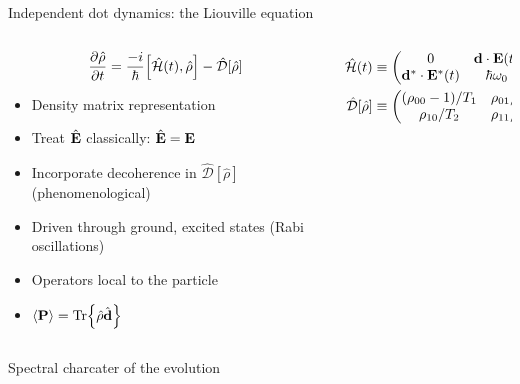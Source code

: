 \documentclass[aspectratio=169, usenames, dvipsnames]{beamer}
\begin{document}
\begin{frame}{Independent dot dynamics: the Liouville equation}
  \begin{columns}
    \begin{column}{0.5\textwidth}
      \begin{equation*}
          \pdv{\hat{\rho}}{t} = \frac{-i}{\hbar} \commutator{\hat{\mathcal{H}}(t)}{\hat{\rho}} - \hat{\mathcal{D}}\qty[\hat{\rho}]
        \end{equation*}
        \begin{itemize}
          \item Density matrix representation %
          \item Treat $\hat{\vb{E}}$ classically: $\hat{\vb{E}} = \vb{E}$
          \item Incorporate decoherence in $\hat{\mathcal{D}}[\hat{\rho}]$ (phenomenological)
          \item Driven through ground, excited states (Rabi oscillations)
          \item Operators local to the particle
          \item $\expval{\vb{P}} = \Tr{\hat{\rho} \hat{\vb{d}}}$
        \end{itemize}
    \end{column}
    \begin{column}{0.5\textwidth}
      
      \vspace{-0.6cm}
      \begin{align*}
        \hat{\mathcal{H}}(t) &\equiv \mqty(0 & \vb{d} \cdot \vb{E}(t) \\ \vb{d}^* \cdot \vb{E}^*(t) & \hbar \omega_0) \\
        \hat{\mathcal{D}}[\hat{\rho}] &\equiv \mqty( (\rho_{00} - 1)/T_1 & \rho_{01}/T_2 \\ \rho_{10}/T_2 & \rho_{11}/T_1)
      \end{align*}
    \end{column}
  \end{columns}
\end{frame}

\begin{frame}{Spectral charcater of the evolution}
  
\end{frame}
\end{document}
